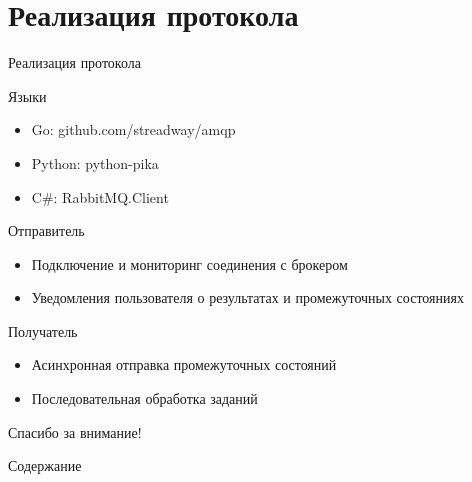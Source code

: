 \documentclass[xetex,mathserif,serif,10pt]{beamer}
\newenvironment{sframe}[2]{\section{#1}\begin{frame}[label=#2]{#1}}{\end{frame}}
\begin{document}
    \begin{sframe}{Реализация протокола}{binddev}
        \begin{block}{Языки}
            \begin{itemize}
                \item Go: github.com/streadway/amqp
                \item Python: python-pika
                \item C\#: RabbitMQ.Client
            \end{itemize}
        \end{block}
        \begin{block}{Отправитель}
            \begin{itemize}
                \item Подключение и мониторинг соединения с брокером
                \item Уведомления пользователя о результатах и промежуточных
                    состояниях
            \end{itemize}
        \end{block}
        \begin{block}{Получатель}
            \begin{itemize}
                \item Асинхронная отправка промежуточных состояний
                \item Последовательная обработка заданий
            \end{itemize}
        \end{block}
    \end{sframe}

    \begin{frame}
        \Large\centering Спасибо за внимание!
    \end{frame}

    \begin{frame}{Содержание}
        \tableofcontents
    \end{frame}
\end{document}
